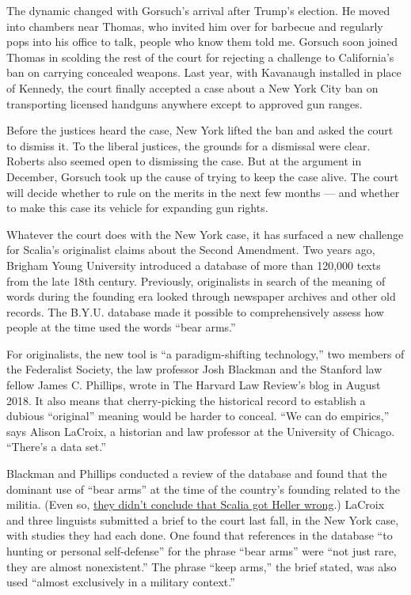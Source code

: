 The dynamic changed with Gorsuch's arrival after Trump's election. He
moved into chambers near Thomas, who invited him over for barbecue and
regularly pops into his office to talk, people who know them told me.
Gorsuch soon joined Thomas in scolding the rest of the court for
rejecting a challenge to California's ban on carrying concealed weapons.
Last year, with Kavanaugh installed in place of Kennedy, the court
finally accepted a case about a New York City ban on transporting
licensed handguns anywhere except to approved gun ranges.

Before the justices heard the case, New York lifted the ban and asked
the court to dismiss it. To the liberal justices, the grounds for a
dismissal were clear. Roberts also seemed open to dismissing the case.
But at the argument in December, Gorsuch took up the cause of trying to
keep the case alive. The court will decide whether to rule on the merits
in the next few months --- and whether to make this case its vehicle for
expanding gun rights.

Whatever the court does with the New York case, it has surfaced a new
challenge for Scalia's originalist claims about the Second Amendment.
Two years ago, Brigham Young University introduced a database of more
than 120,000 texts from the late 18th century. Previously, originalists
in search of the meaning of words during the founding era looked through
newspaper archives and other old records. The B.Y.U. database made it
possible to comprehensively assess how people at the time used the words
``bear arms.''

For originalists, the new tool is ``a paradigm-shifting technology,''
two members of the Federalist Society, the law professor Josh Blackman
and the Stanford law fellow James C. Phillips, wrote in The Harvard Law
Review's blog in August 2018. It also means that cherry-picking the
historical record to establish a dubious ``original'' meaning would be
harder to conceal. ``We can do empirics,'' says Alison LaCroix, a
historian and law professor at the University of Chicago. ``There's a
data set.''

Blackman and Phillips conducted a review of the database and found that
the dominant use of ``bear arms'' at the time of the country's founding
related to the militia. (Even so,
\href{https://www.theatlantic.com/ideas/archive/2020/02/big-data-second-amendment/607186/}{they
didn't conclude that Scalia got Heller wrong}.) LaCroix and three
linguists submitted a brief to the court last fall, in the New York
case, with studies they had each done. One found that references in the
database ``to hunting or personal self-defense'' for the phrase ``bear
arms'' were ``not just rare, they are almost nonexistent.'' The phrase
``keep arms,'' the brief stated, was also used ``almost exclusively in a
military context.''

